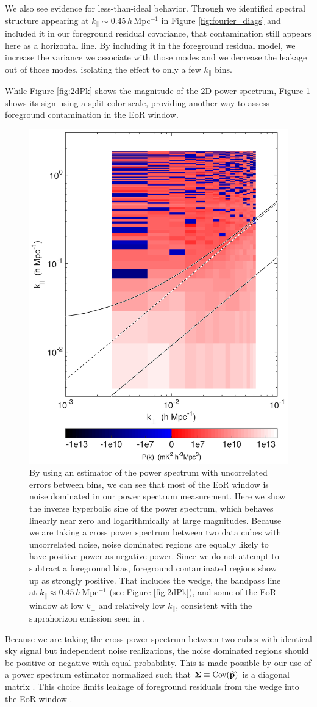 We also see evidence for less-than-ideal behavior. Through we identified spectral structure appearing at $k_\| \sim 0.45$\,$h$\,Mpc$^{-1}$ in Figure \ref{fig:fourier_diags} and included it in our foreground residual covariance, that contamination still appears here as a horizontal line. By including it in the foreground residual model, we increase the variance we associate with those modes and we decrease the leakage out of those modes, isolating the effect to only a few $k_\|$ bins.

While Figure \ref{fig:2dPk} shows the magnitude of the 2D power spectrum, Figure \ref{fig:2dPkArcSinh} shows its sign using a split color scale, providing another way to assess foreground contamination in the EoR window. 
\begin{figure}[] 
	\centering 
	\includegraphics[width=.48\textwidth]{chap4_empirical_covariance/2dPkArcSinh.png}
	\caption[By using an estimator of the power spectrum with uncorrelated errors between bins, we can see that most of the EoR window is noise dominated.]{By using an estimator of the power spectrum with uncorrelated errors between bins, we can see that most of the EoR window is noise dominated in our power spectrum measurement. Here we show the inverse hyperbolic sine of the power spectrum, which behaves linearly near zero and logarithmically at large magnitudes. Because we are taking a cross power spectrum between two data cubes with uncorrelated noise, noise dominated regions are equally likely to have positive power as negative power. Since we do not attempt to subtract a foreground bias, foreground contaminated regions show up as strongly positive. That includes the wedge, the bandpass line at $k_\| \approx 0.45$\,$h$\,Mpc$^{-1}$  (see Figure \ref{fig:2dPk}), and some of the EoR window at low $k_\perp$ and relatively low $k_\|$, consistent with the suprahorizon emission seen in \cite{pober13}.}
	\label{fig:2dPkArcSinh}
\end{figure}  
Because we are taking the cross power spectrum between two cubes with identical sky signal but independent noise realizations, the noise dominated regions should be positive or negative with equal probability. This is made possible by our use of a power spectrum estimator normalized such that $\boldsymbol\Sigma \equiv \text{Cov}(\widehat{\mathbf{p}})$ is a diagonal matrix \cite{DillonFast}. This choice limits leakage of foreground residuals from the wedge into the EoR window \cite{X13}.


